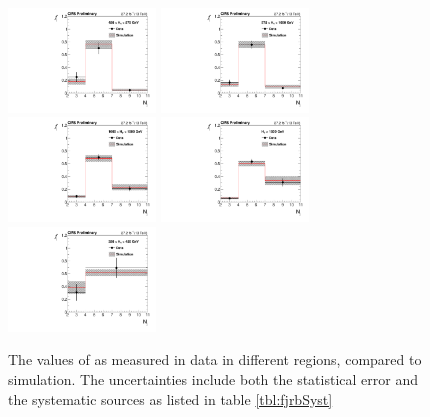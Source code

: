 \begin{figure}
	\centering
	\includegraphics[width=0.35\textwidth]{backgrounds/figs/f_jets_HT450to575_j2toInf_b0toInf}
	\includegraphics[width=0.35\textwidth]{backgrounds/figs/f_jets_HT575to1000_j2toInf_b0toInf}
	\includegraphics[width=0.35\textwidth]{backgrounds/figs/f_jets_HT1000to1500_j2toInf_b0toInf}
	\includegraphics[width=0.35\textwidth]{backgrounds/figs/f_jets_HT1500toInf_j2toInf_b0toInf.pdf}
	\includegraphics[width=0.35\textwidth]{backgrounds/figs/f_jets_HT250to450_j2toInf_b0toInf}
	\renewcommand{\baselinestretch}{1.0}
	\caption[The values of \fj as measured in data in different \HT regions, compared to simulation.]{The values of \fj as measured in data in different \HT regions, compared to simulation. The uncertainties include both the statistical error and the systematic sources as listed in table \ref{tbl:fjrbSyst}}
	\label{fig:fj}
\end{figure}
